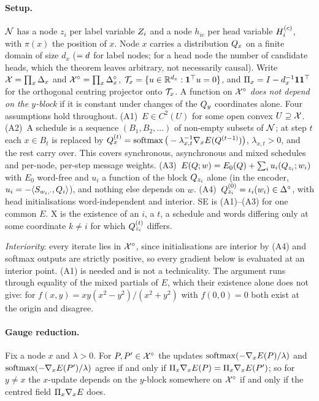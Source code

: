 \paragraph{Setup.}
$\mathcal{N}$ has a node $z_i$ per label variable $Z_{i}$ and a node $h_{ic}$ per head variable
$H_{i}^{(c)}$, with $\pi(x)$ the position of $x$. Node $x$ carries a distribution $Q_x$ on a
finite domain of size $d_x$ ($=d$ for label nodes; for a head node the number of candidate
heads, which the theorem leaves arbitrary, not necessarily causal). Write
$\mathcal{X} = \prod_x \Delta_x$ and $\mathcal{X}^{\circ} = \prod_x \Delta^\circ_x$,
$\mathcal{T}_{x} = \{u \in \mathbb{R}^{d_x} : \mathbf{1}^{\top}u = 0\}$, and
$\Pi_{x} = I - d_x^{-1}\mathbf{1}\mathbf{1}^{\top}$ for the orthogonal centring projector onto
$\mathcal{T}_{x}$. A function on $\mathcal{X}^{\circ}$ \emph{does not depend on the $y$-block} if it is constant under
changes of the $Q_y$ coordinates alone. Four assumptions hold throughout.
(A1)~$E \in C^2(U)$ for some open convex $U \supseteq \mathcal{X}$. (A2)~A schedule is a sequence
$(B_1, B_2, \dots)$ of non-empty subsets of $\mathcal{N}$; at step $t$ each $x \in B_t$ is replaced
by $Q_x^{(t)} = \operatorname{softmax}\big(-\lambda_{x,t}^{-1}\nabla_x E(Q^{(t-1)})\big)$,
$\lambda_{x,t}>0$, and the rest carry over. This covers synchronous, asynchronous and mixed
schedules and per-node, per-step message weights. (A3)~$E(Q;w) = E_0(Q) + \sum_i
u_i(Q_{z_i}; w_i)$ with $E_0$ word-free and $u_i$ a function of the block $Q_{z_i}$ alone (in
the encoder, $u_i = -\langle S_{w_i,\cdot},Q_i\rangle$), and nothing else depends on $w$.
(A4)~$Q_{z_i}^{(0)} = \iota_i(w_i) \in \Delta^\circ$, with head initialisations word-independent
and interior. SE is (A1)--(A3) for one common $E$. X is the existence of an $i$, a $t$, a
schedule and words differing only at some coordinate $k \neq i$ for which $Q_{z_i}^{(t)}$
differs.

\emph{Interiority}: every iterate lies in $\mathcal{X}^{\circ}$, since initialisations are interior by (A4) and
softmax outputs are strictly positive, so every gradient below is evaluated at an interior point.
(A1) is needed and is not a technicality. The argument runs through equality of the mixed
partials of $E$, which their existence alone does not give: for
$f(x,y) = xy(x^2-y^2)/(x^2+y^2)$ with $f(0,0)=0$ both exist at the origin and disagree.

\paragraph{Gauge reduction.}

\begin{lemma}
\label{app:lem-gauge}
Fix a node $x$ and $\lambda>0$. For $P, P' \in \mathcal{X}^{\circ}$ the updates
$\operatorname{softmax}(-\nabla_x E(P)/\lambda)$ and $\operatorname{softmax}(-\nabla_x E(P')/\lambda)$ agree if and only if
$\Pi_{x}\nabla_x E(P) = \Pi_{x}\nabla_x E(P')$; so for $y \neq x$ the $x$-update depends on the
$y$-block somewhere on $\mathcal{X}^{\circ}$ if and only if the centred field $\Pi_{x}\nabla_x E$ does.
\end{lemma}

